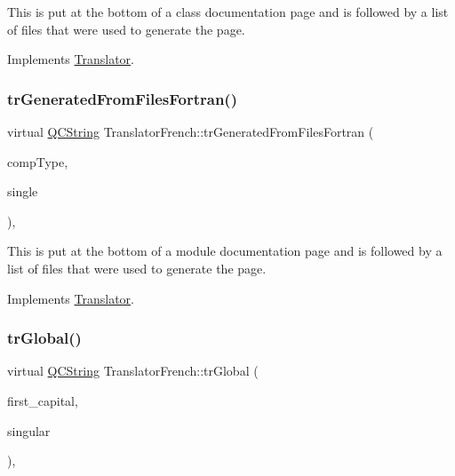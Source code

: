 This is put at the bottom of a class documentation page and is followed by a list of files that were used to generate the page. 

Implements \mbox{\hyperlink{class_translator}{Translator}}.

\mbox{\label{class_translator_french_a3c8f3213be4991fff5b08195ab3d1cd2}} 
\subsubsection{\texorpdfstring{trGeneratedFromFilesFortran()}{trGeneratedFromFilesFortran()}}
{\footnotesize\ttfamily virtual \mbox{\hyperlink{class_q_c_string}{Q\+C\+String}} Translator\+French\+::tr\+Generated\+From\+Files\+Fortran (\begin{DoxyParamCaption}\item[{\mbox{\hyperlink{class_class_def_ae70cf86d35fe954a94c566fbcfc87939}{Class\+Def\+::\+Compound\+Type}}}]{comp\+Type,  }\item[{bool}]{single }\end{DoxyParamCaption})\hspace{0.3cm}{\ttfamily [inline]}, {\ttfamily [virtual]}}

This is put at the bottom of a module documentation page and is followed by a list of files that were used to generate the page. 

Implements \mbox{\hyperlink{class_translator}{Translator}}.

\mbox{\label{class_translator_french_a7cb12d593debd21445a34b19be89bc7c}} 
\subsubsection{\texorpdfstring{trGlobal()}{trGlobal()}}
{\footnotesize\ttfamily virtual \mbox{\hyperlink{class_q_c_string}{Q\+C\+String}} Translator\+French\+::tr\+Global (\begin{DoxyParamCaption}\item[{bool}]{first\+\_\+capital,  }\item[{bool}]{singular }\end{DoxyParamCaption})\hspace{0.3cm}{\ttfamily [inline]}, {\ttfamily [virtual]}}

